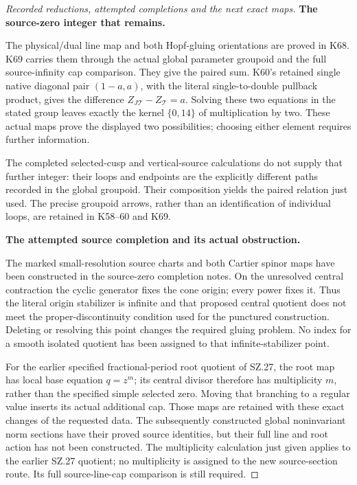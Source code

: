 \begin{proof}[Recorded reductions, attempted completions and the next exact maps]
\par\medskip\noindent\textbf{The source-zero integer that remains.}\par\nopagebreak[4]
The physical/dual line map and both Hopf-gluing orientations are
proved in K68. K69 carries them through the actual global
parameter groupoid and the full source-infinity cap comparison.
They give the paired sum. K60's retained single native diagonal
pair \((1-a,a)\), with the literal single-to-double pullback
product, gives the difference \(Z_{J\mathcal T}-Z_{\mathcal T}=a\).
Solving these two equations in the stated group leaves exactly
the kernel \(\{0,14\}\) of multiplication by two. These actual
maps prove the displayed two possibilities; choosing either
element requires further information.

The completed selected-cusp and vertical-source calculations
do not supply that further integer: their loops and endpoints
are the explicitly different paths recorded in the global
groupoid. Their composition yields the paired relation just
used. The precise groupoid arrows, rather than an identification
of individual loops, are retained in K58--60 and K69.

\par\medskip\noindent\textbf{The attempted source completion and its actual obstruction.}\par\nopagebreak[4]
The marked small-resolution source charts and both Cartier
spinor maps have been constructed in the source-zero completion
notes. On the unresolved central contraction the cyclic
generator fixes the cone origin; every power fixes it. Thus
the literal origin stabilizer is infinite and that proposed
central quotient does not meet the proper-discontinuity
condition used for the punctured construction. Deleting or
resolving this point changes the required gluing problem.
No index for a smooth isolated quotient has been assigned
to that infinite-stabilizer point.

For the earlier specified fractional-period root quotient
of SZ.27, the root map has local base equation \(q=z^m\);
its central
divisor therefore has multiplicity \(m\), rather than the
specified simple selected zero. Moving that branching to a
regular value inserts its actual additional cap. Those maps
are retained with these exact changes of the requested data.
The subsequently constructed global noninvariant norm sections
have their proved source identities, but their full line and
root action has not been constructed. The multiplicity
calculation just given applies to the earlier SZ.27 quotient;
no multiplicity is assigned to the new source-section route.
Its full source-line-cap comparison is still required.


\end{proof}

